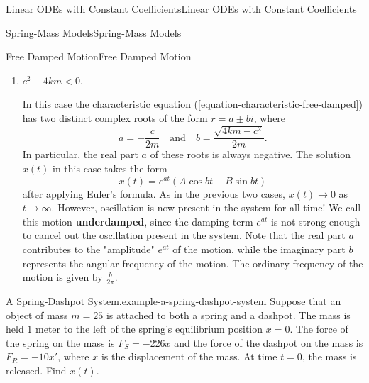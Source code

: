\documentclass[10pt,]{book}
\newcommand{\terminology}[1]{\textbf{#1}}
\numberwithin{equation}{section}
\newcommand{\lt}{<}
\begin{document}
\begin{chapterptx}{Linear ODEs with Constant Coefficients}{}{Linear ODEs with Constant Coefficients}{}{}
\begin{sectionptx}{Spring-Mass Models}{}{Spring-Mass Models}{}{}
\begin{subsectionptx}{Free Damped Motion}{}{Free Damped Motion}{}{}
\begin{enumerate}[label=\arabic*:]
\(c^{2} - 4km = 0\).%
\par
\hypertarget{p-215}{}%
In this case, the characteristic equation \hyperref[equation-characteristic-free-damped]{(\ref{equation-characteristic-free-damped})} has a repeated (real) root, and so the solution \(x(t)\) takes the form%
\begin{equation*}
x(t) = e^{r_{1}t}(c_{1} + c_{2}t).
\end{equation*}
This mass can pass through \(x = 0\) only once, at \(t = -\frac{c_{1}}{c_{2}}\). Once it does, the mass will "turn around" soon afterwards and beginning moving back to \(0\), as in the first case. We call this type of motion \terminology{critically damped}, since it's right on the border between overdamped motion and oscillating motion.%
\item\hypertarget{li-19}{}\hypertarget{p-216}{}%
\(c^{2} - 4km \lt 0\).%
\par
\hypertarget{p-217}{}%
In this case the characteristic equation \hyperref[equation-characteristic-free-damped]{(\ref{equation-characteristic-free-damped})} has two distinct complex roots of the form \(r = a \pm bi\), where%
\begin{equation*}
a = -\frac{c}{2m}\quad\text{and}\quad b = \frac{\sqrt{4km - c^{2}}}{2m}.
\end{equation*}
In particular, the real part \(a\) of these roots is always negative. The solution \(x(t)\) in this case takes the form%
\begin{equation*}
x(t) = e^{at}(A\cos bt + B\sin bt)
\end{equation*}
after applying Euler's formula. As in the previous two cases, \(x(t)\to0\) as \(t\to\infty\). However, oscillation is now present in the system for all time! We call this motion \terminology{underdamped}, since the damping term \(e^{at}\) is not strong enough to cancel out the oscillation present in the system. Note that the real part \(a\) contributes to the "amplitude" \(e^{at}\) of the motion, while the imaginary part \(b\) represents the angular frequency of the motion. The ordinary frequency of the motion is given by \(\frac{b}{2\pi}\).%
\end{enumerate}
\begin{example}{A Spring-Dashpot System.}{example-a-spring-dashpot-system}%
\hypertarget{p-218}{}%
Suppose that an object of mass \(m = 25\) is attached to both a spring and a dashpot. The mass is held \(1\) meter to the left of the spring's equilibrium position \(x = 0\). The force of the spring on the mass is \(F_{S} = -226x\) and the force of the dashpot on the mass is \(F_{R} = -10x'\), where \(x\) is the displacement of the mass. At time \(t = 0\), the mass is released. Find \(x(t)\).%

\end{example}
\end{subsectionptx}
\end{sectionptx}
\end{chapterptx}
\end{document}

